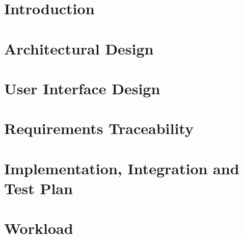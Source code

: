 \documentclass{template/class}
\begin{document}
\frontmatter


\tableofcontents

\mainmatter
\setcounter{page}{1}

\chapter{Introduction}


\chapter{Architectural Design}


\chapter{User Interface Design}


\chapter{Requirements Traceability}


\chapter{Implementation, Integration and Test Plan}


\chapter{Workload}


\printbibliography

\listoffigures

\listoftables
\end{document}
